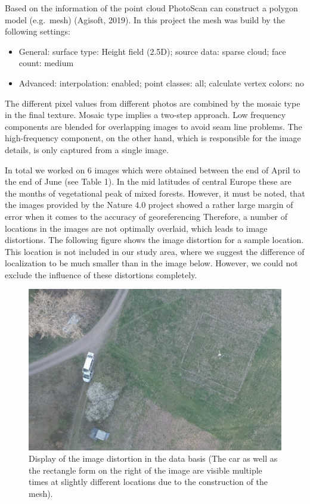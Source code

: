 \documentclass[]{article}
\begin{document}
Based on the information of the point cloud PhotoScan can construct a
polygon model (e.g.~mesh) (Agisoft, 2019). In this project the mesh was
build by the following settings:

\begin{itemize}
\item
  General: surface type: Height field (2.5D); source data: sparse cloud;
  face count: medium
\item
  Advanced: interpolation: enabled; point classes: all; calculate vertex
  colors: no
\end{itemize}

The different pixel values from different photos are combined by the
mosaic type in the final texture. Mosaic type implies a two-step
approach. Low frequency components are blended for overlapping images to
avoid seam line problems. The high-frequency component, on the other
hand, which is responsible for the image details, is only captured from
a single image.

In total we worked on 6 images which were obtained between the end of
April to the end of June (see Table 1). In the mid latitudes of central
Europe these are the months of vegetational peak of mixed forests.
However, it must be noted, that the images provided by the Nature 4.0
project showed a rather large margin of error when it comes to the
accuracy of georeferencing Therefore, a number of locations in the
images are not optimally overlaid, which leads to image distortions. The
following figure shows the image distortion for a sample location. This
location is not included in our study area, where we suggest the
difference of localization to be much smaller than in the image below.
However, we could not exclude the influence of these distortions
completely.

\begin{figure}[H]

{\centering \includegraphics[width=0.6\linewidth]{report_files/figure-latex/Image distortion-1} 

}

\caption{Display of the image distortion in the data basis (The car as well as the rectangle form on the right of the image are visible multiple times at slightly different locations due to the construction of the mesh).}\label{fig:Image distortion}
\end{figure}
\end{document}
